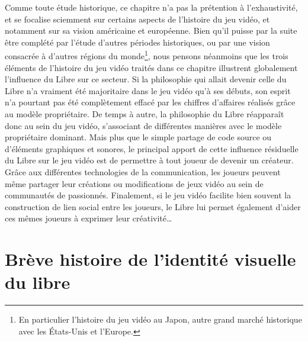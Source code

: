 \documentclass{FramateX}
\begin{document}
\begin{refsection}
Comme toute étude historique, ce chapitre n'a pas la prétention à
l'exhaustivité, et se focalise sciemment sur certains aspects de
l'histoire du jeu vidéo, et notamment sur sa vision américaine et
européenne. Bien qu'il puisse par la suite être complété par l'étude
d'autres périodes historiques, ou par une vision consacrée à d'autres
régions du monde\footnote{En particulier
l'histoire du jeu vidéo au Japon, autre grand marché historique avec
les États-Unis et l'Europe.}, nous pensons néanmoins que les trois
éléments de l'histoire du jeu vidéo traités dans ce chapitre illustrent
globalement l'influence du Libre sur ce secteur. Si la philosophie qui
allait devenir celle du Libre n'a vraiment été majoritaire dans le jeu
vidéo qu'à ses débuts, son esprit n'a pourtant pas été complètement
effacé par les chiffres d'affaires réalisés grâce au modèle
propriétaire. De temps à autre, la philosophie du Libre réapparaît donc
au sein du jeu vidéo, s'associant de différentes manières avec le
modèle propriétaire dominant. Mais plus que le simple partage de code
source ou d'éléments graphiques et sonores, le principal apport de
cette influence résiduelle du Libre sur le jeu vidéo est de permettre à
tout joueur de devenir un créateur. Grâce aux différentes technologies
de la communication, les joueurs peuvent même partager leur créations
ou modifications de jeux vidéo au sein de communautés de passionnés.
Finalement, si le jeu vidéo facilite bien souvent la construction de
lien social entre les joueurs, le Libre lui permet également d'aider
ces mêmes joueurs à exprimer leur créativité…


\printbibliography[heading=subbibliography]
\end{refsection}

\chapter*{Brève histoire de l'identité visuelle du libre}      
{}
\end{document}

